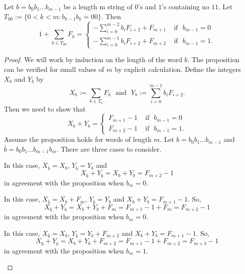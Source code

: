 \documentclass[10pt,a4paper]{amsart}
\begin{document}
\begin{proposition}
Let $b = b_0 b_1 \dots b_{m-1}$ be a length m string of $0$'s and $1$'s containing no $11$.  Let $T_{00} := \{0 < k < m : b_{k-1} b_k = 0 0 \}$. Then
\begin{equation*}
1 + \sum_{k \in T_{00}} F_k = 
\begin{cases}
-\sum_{i=0}^{m-2} b_i F_{i+2} + F_{m+1} & \text{   if   }  \,\, b_{m-1} = 0 \\
-\sum_{i=0}^{m-1} b_i F_{i+2} + F_{m+2} & \text{   if   }  \,\, b_{m-1} = 1 .
\end{cases}
\end{equation*}
\end{proposition}

\begin{proof}
We will work by induction on the length of the word $b$. The proposition can be verified for small values of $m$ by explicit calculation. Define the integers $X_b$ and $Y_b$ by
$$
X_b := \sum_{k \in T_{b}} F_k \,\, \text{  and   } \,\, Y_b := \sum_{i=0}^{m-1} b_i F_{i+2} .
$$
Then we need to show that 
\begin{equation*}
X_b + Y_b = 
\begin{cases}
F_{m+1} - 1 & \text{   if   }  \,\, b_{m-1} = 0 \\
F_{m+2} - 1 & \text{   if   }  \,\, b_{m-1} = 1 .
\end{cases}
\end{equation*}
Assume the proposition holds for words of length $m$. Let $b = b_0 b_1 \dots b_{m-1}$ and $\bar{b} = b_0 b_1 \dots b_{m-1} b_m$. There are three cases to consider.

\bigskip
\begin{case}[ $b_{m-1} = 1, b_m = 0$]
In this case, $X_{\bar{b}} = X_b$, $Y_{\bar{b}} = Y_b$ and 
$$
X_{\bar{b}} + Y_{\bar{b}}  = X_b + Y_b = F_{m+2} - 1
$$ 
in agreement with the proposition when $ b_m = 0$.
\end{case}
\bigskip
\begin{case}[ $b_{m-1} = 0, b_m = 0$]
In this case, $X_{\bar{b}} = X_b + F_m$, $Y_{\bar{b}} = Y_b$ and $X_b + Y_b = F_{m+1} - 1$. So,  
$$
X_{\bar{b}} + Y_{\bar{b}}  = X_b + Y_b + F_m = F_{m+1} - 1 + F_m = F_{m+2} - 1
$$
in agreement with the proposition when $ b_m = 0$.
\end{case}
\bigskip
\begin{case}[ $b_{m-1} = 0, b_m = 1$]
In this case, $X_{\bar{b}} = X_b$, $Y_{\bar{b}} = Y_b + F_{m+2}$ and $X_b + Y_b = F_{m+1} - 1$. So,  
$$
X_{\bar{b}} + Y_{\bar{b}}  = X_b + Y_b + F_{m+2} = F_{m+1} - 1 + F_{m+2} = F_{m+3} - 1
$$
in agreement with the proposition when $ b_m = 1$.
\end{case}
\end{proof}
\end{document}
